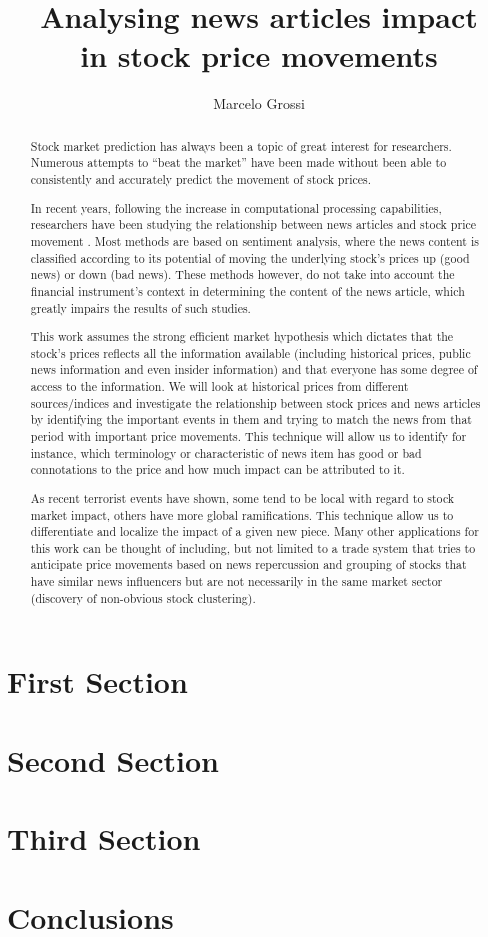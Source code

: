 \documentclass{article}
\title{Analysing news articles impact \\ in stock price movements}
\author{Marcelo Grossi}
\begin{document}
\maketitle
\begin{abstract}
Stock market prediction has always been a topic of great interest for researchers. Numerous attempts to ``beat the market'' have been made without been able to consistently and accurately predict the movement of stock prices.
\par
In recent years, following the increase in computational processing capabilities, researchers have been studying the relationship between news articles and stock price movement \citep{Fu2008}\citep{Schumaker2009}. Most methods are based on sentiment analysis, where the news content is classified according to its potential of moving the underlying stock’s prices up (good news) or down (bad news). These methods however, do not take into account the financial instrument's context in determining the content of the news article, which greatly impairs the results of such studies.
\par
This work assumes the strong efficient market hypothesis which dictates that the stock's prices reflects all the information available (including historical prices, public news information and even insider information) \citep{fama1965behavior} and that everyone has some degree of access to the information. We will look at historical prices from different sources/indices and investigate the relationship between stock prices and news articles by identifying the important events in them and trying to match the news from that period with important price movements. This technique will allow us to identify for instance, which terminology or characteristic of news item has good or bad connotations to the price and how much impact can be attributed to it.
\par
As recent terrorist events have shown, some tend to be local with regard to stock market impact, others have more global ramifications.  This technique allow us to differentiate and localize the impact of a given new piece. Many other applications for this work can be thought of including, but not limited to a trade system that tries to anticipate price movements based on news repercussion and grouping of stocks that have similar news influencers but are not necessarily in the same market sector (discovery of non-obvious stock clustering).
\end{abstract}
\section{First Section}
\section{Second Section}
\section{Third Section}
\section{Conclusions}

\end{document}
